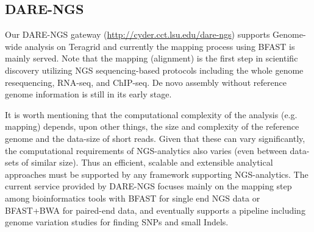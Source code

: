 \documentclass{sig-alternate}
\begin{document}
\subsection{DARE-NGS}
Our DARE-NGS gateway (\url {http://cyder.cct.lsu.edu/dare-ngs}) supports Genome-wide analysis on Teragrid and currently the mapping process using BFAST is mainly served\cite{bfast2009, bfast2009b}. Note that the mapping (alignment) is the first step in scientific discovery utilizing NGS sequencing-based protocols including the whole genome resequencing, RNA-seq, and ChIP-seq.  De novo assembly without reference genome information is still in its early stage.  

It is worth mentioning that the computational complexity
of the analysis (e.g. mapping) depends, upon other things, the size
and complexity of the reference genome and the data-size of short reads.
Given that these can vary significantly, the computational
requirements of NGS-analytics also varies (even between data-sets of
similar size).  Thus an efficient, scalable and extensible analytical
approaches must be supported by any framework supporting
NGS-analytics.  The current service provided by DARE-NGS focuses mainly on the mapping step among bioinformatics tools with BFAST for single end NGS data or BFAST+BWA for paired-end data, and eventually supports a pipeline including genome variation studies for finding SNPs and small Indels.
\end{document}
